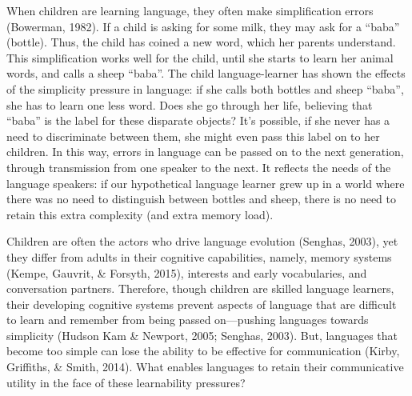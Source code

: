 \documentclass[10pt, letterpaper]{article}
\begin{document}
When children are learning language, they often make simplification
errors (Bowerman, 1982). If a child is asking for some milk, they may
ask for a ``baba'' (bottle). Thus, the child has coined a new word,
which her parents understand. This simplification works well for the
child, until she starts to learn her animal words, and calls a sheep
``baba''. The child language-learner has shown the effects of the
simplicity pressure in language: if she calls both bottles and sheep
``baba'', she has to learn one less word. Does she go through her life,
believing that ``baba'' is the label for these disparate objects? It's
possible, if she never has a need to discriminate between them, she
might even pass this label on to her children. In this way, errors in
language can be passed on to the next generation, through transmission
from one speaker to the next. It reflects the needs of the language
speakers: if our hypothetical language learner grew up in a world where
there was no need to distinguish between bottles and sheep, there is no
need to retain this extra complexity (and extra memory load).

Children are often the actors who drive language evolution (Senghas,
2003), yet they differ from adults in their cognitive capabilities,
namely, memory systems (Kempe, Gauvrit, \& Forsyth, 2015), interests and
early vocabularies, and conversation partners. Therefore, though
children are skilled language learners, their developing cognitive
systems prevent aspects of language that are difficult to learn and
remember from being passed on---pushing languages towards simplicity
(Hudson Kam \& Newport, 2005; Senghas, 2003). But, languages that become
too simple can lose the ability to be effective for communication
(Kirby, Griffiths, \& Smith, 2014). What enables languages to retain
their communicative utility in the face of these learnability pressures?
\end{document}
